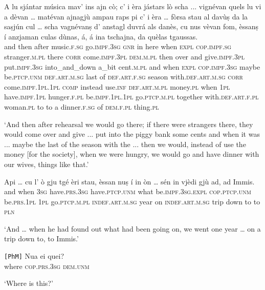 \begin{linenumbers}
\gll    A lu sjántar música mav’ ins ajn cò; c’ i èra jástars lò scha ... vignévan quels lu vi a dèvan … matévan ajnagjù ampau raps pi c’ i èra … fòrsa stau al davùṣ da la saṣjún  cul … scha vagnévanṣ d’ anstagl duvrá als danès, cu nus vèvan fom, èssanṣ í anzjaman culas dùnas, á, á ina tschajna, da quèlas tgaussas.\\
and then after music.\textsc{f.sg} go.\textsc{impf.3sg} \textsc{gnr} in here when \textsc{expl} \textsc{cop.impf.sg} stranger.\textsc{m.pl} there \textsc{corr} {} come.\textsc{impf.3pl} \textsc{dem.m.pl} then over and give.\textsc{impf.3pl} {} put.\textsc{impf.3sg} into\_and\_down a\_bit cent.\textsc{m.pl} and when \textsc{expl} \textsc{cop.impf.3sg} {} maybe be.\textsc{ptcp.unm} \textsc{def.art.m.sg} last of    \textsc{def.art.f.sg} season with.\textsc{def.art.m.sg} {} \textsc{corr} come.\textsc{impf.1pl.1pl} \textsc{comp} instead use.\textsc{inf}  \textsc{def.art.m.pl} money.\textsc{pl} when  \textsc{1pl} have.\textsc{impf.1pl} hunger.\textsc{f.pl} be.\textsc{impf.1pl.1pl} go.\textsc{ptcp.m.pl} together with.\textsc{def.art.f.pl} woman.\textsc{pl} to to a dinner.\textsc{f.sg} of \textsc{dem.f.pl} thing.\textsc{pl}\\
\end{linenumbers}
\medskip
\glt `And then after rehearsal we would go there; if there were strangers there, they would come over and give ... put into the piggy bank  some cents and when it was ... maybe the last of the season with the ... then we would, instead of use the money [for the society], when we were hungry, we would go and have dinner with our wives, things like that.'
\medskip

\begin{linenumbers}
\gll    Api … cu l’ ò gju tgé èri stau, èssan nuṣ í in òn … sén in vjèdi gjù ad, ad Immis.\\
and {} when \textsc{3sg} have.\textsc{prs.3sg} have.\textsc{ptcp.unm} what be.\textsc{impf.3sg.expl} \textsc{cop.ptcp.unm} be.\textsc{prs.1pl} \textsc{1pl} go.\textsc{ptcp.m.pl} \textsc{indef.art.m.sg} year {} on \textsc{indef.art.m.sg} trip down to to \textsc{pln} \\
\end{linenumbers}
\medskip
\glt `And … when he had found out what had been going on, we went one year … on a trip down to, to Immis.'
\medskip

\begin{linenumbers}
\gll    \texttt{[PhM]} Nua ei quei?\\
{} where \textsc{cop.prs.3sg} \textsc{dem.unm}\\
\end{linenumbers}
\medskip
\glt `Where is this?'
\medskip

